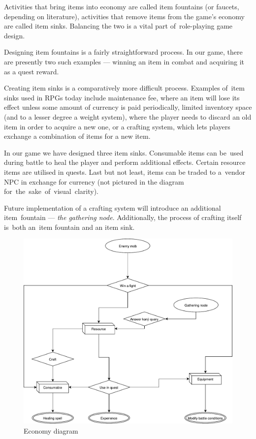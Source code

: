 \documentclass[thesis=B,english,hidelinks]{FITthesisXE}[2012/06/26]
\begin{document}
Activities that bring items into economy are called item fountains (or faucets, depending on literature), activities that remove items from the game's economy are called item sinks. Balancing the two is a vital part of~role-playing game design.

Designing item fountains is a fairly straightforward process. In our game, there are presently two such examples --- winning an item in combat and acquiring it as a quest reward.

Creating item sinks is a comparatively more difficult process. Examples of~item sinks used in RPGs today include maintenance fee, where an item will lose its effect unless some amount of currency is paid periodically, limited inventory space (and to a lesser degree a weight system), where the player needs to discard an old item in order to acquire a new one, or a crafting system, which lets players exchange a combination of items for a new item\autocite{economies}.

In our game we have designed three item sinks. Consumable items can be~used during battle to heal the player and perform additional effects. Certain resource items are utilised in quests. Last but not least, items can be traded to a~vendor NPC in exchange for currency (not pictured in the diagram for~the~sake~of~visual~clarity).

Future implementation of a crafting system will introduce an additional item~fountain --- \emph{the gathering node}. Additionally, the process of crafting itself is~both an~item fountain and an item sink.

\newpage

\begin{figure}[htb]
\centering
\includegraphics[scale=0.6]{item_economy}
\caption{Economy diagram}
\label{fig:item_economy}
\end{figure}
\end{document}

